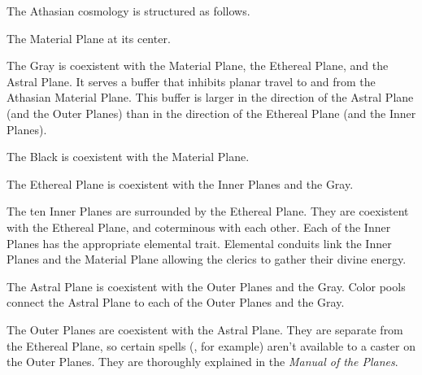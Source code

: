 The Athasian cosmology is structured as follows.
\begin{itemize*}
\item The Material Plane at its center.
\item The Gray is coexistent with the Material Plane, the Ethereal Plane, and the Astral Plane. It serves a buffer that inhibits planar travel to and from the Athasian Material Plane. This buffer is larger in the direction of the Astral Plane (and the Outer Planes) than in the direction of the Ethereal Plane (and the Inner Planes).
\item The Black is coexistent with the Material Plane.
\item The Ethereal Plane is coexistent with the Inner Planes and the Gray.
\item The ten Inner Planes are surrounded by the Ethereal Plane. They are coexistent with the Ethereal Plane, and coterminous with each other. Each of the Inner Planes has the appropriate elemental trait. Elemental conduits link the Inner Planes and the Material Plane allowing the clerics to gather their divine energy.
\item The Astral Plane is coexistent with the Outer Planes and the Gray. Color pools connect the Astral Plane to each of the Outer Planes and the Gray.


\item The Outer Planes are coexistent with the Astral Plane. They are separate from the Ethereal Plane, so certain spells (, for example) aren't available to a caster on the Outer Planes. They are thoroughly explained in the \emph{Manual of the Planes}.
\end{itemize*}

